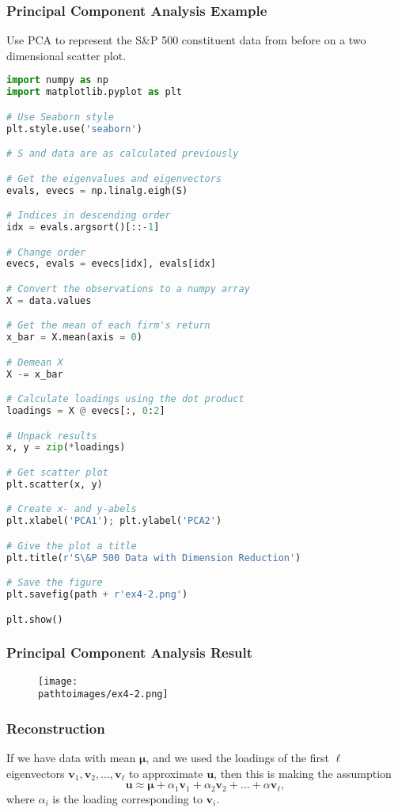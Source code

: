 \documentclass{beamer}
\newcommand{\pathtoimages}{/Users/charlesrambo/Desktop/Bootcamp24/Images}
\begin{document}
\begin{frame}[fragile]
\frametitle{Principal Component Analysis Example}
\begin{Example}
Use PCA to represent the S\&P 500 constituent data from before on a two dimensional scatter plot.
\end{Example}
\begin{multicols}{2}
\begin{lstlisting}[language=Python]
import numpy as np
import matplotlib.pyplot as plt

# Use Seaborn style
plt.style.use('seaborn')

# S and data are as calculated previously

# Get the eigenvalues and eigenvectors
evals, evecs = np.linalg.eigh(S)

# Indices in descending order
idx = evals.argsort()[::-1]

# Change order
evecs, evals = evecs[idx], evals[idx]

# Convert the observations to a numpy array
X = data.values

# Get the mean of each firm's return
x_bar = X.mean(axis = 0)

# Demean X
X -= x_bar

# Calculate loadings using the dot product
loadings = X @ evecs[:, 0:2]

# Unpack results
x, y = zip(*loadings)

# Get scatter plot
plt.scatter(x, y)

# Create x- and y-abels
plt.xlabel('PCA1'); plt.ylabel('PCA2')

# Give the plot a title
plt.title(r'S\&P 500 Data with Dimension Reduction')

# Save the figure
plt.savefig(path + r'ex4-2.png')

plt.show()
\end{lstlisting}
\end{multicols}
\end{frame}

\begin{frame}
\frametitle{Principal Component Analysis Result}
\begin{figure}
\centering
\texttt{[image: \\pathtoimages/ex4-2.png]}
\end{figure}

\end{frame}

\begin{frame}
\frametitle{Reconstruction}
If we have data with mean $ {\boldsymbol \mu}$, and we used the loadings of the first $\ell$ eigenvectors ${\boldsymbol v_1}, {\boldsymbol v_2},\ldots, {\boldsymbol v_\ell}$ to approximate ${\boldsymbol u}$, then this is making the assumption
$$
{\boldsymbol u} \approx  {\boldsymbol \mu} + \alpha_1 {\boldsymbol v_1} + \alpha_2 {\boldsymbol v_2}+\ldots + \alpha {\boldsymbol v_\ell},
$$
where $\alpha_i$ is the loading corresponding to ${\boldsymbol v_i}$. 

\end{frame}
\end{document}
